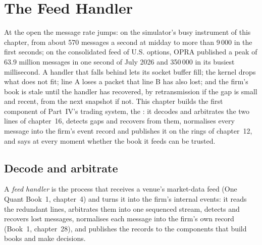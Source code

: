 \chapter{The Feed Handler}\label{ch:ll:the-feed-handler}

At the open the message rate jumps: on the simulator's busy instrument of this chapter, from about 570 messages a second at
midday to more than 9\,000 in the first seconds; on the consolidated feed of U.S. options, OPRA published a peak of 63.9
million messages in one second of July 2026 and 350\,000 in its busiest millisecond. A handler that falls behind lets its
socket buffer fill; the kernel drops what does not fit; line A loses a packet that line B has also lost; and the firm's book
is stale until the handler has recovered, by retransmission if the gap is small and recent, from the next snapshot if not.
This chapter builds the first component of Part~IV's trading system, the : it decodes and arbitrates the two
lines of chapter~16, detects gaps and recovers from them, normalises every message into the firm's event record and publishes
it on the rings of chapter~12, and says at every moment whether the book it feeds can be trusted.

\section{Decode and arbitrate}

\begin{definition}\label{def:ll:the-feed-handler:handler}
A \emph{feed handler} is the process that receives a venue's market-data feed (One Quant Book~1,
chapter~4) and turns it into the firm's internal events: it reads the redundant lines, arbitrates them into one sequenced
stream, detects and recovers lost messages, normalises each message into the firm's own record (Book~1, chapter~28), and
publishes the records to the components that build books and make decisions.
\end{definition}

